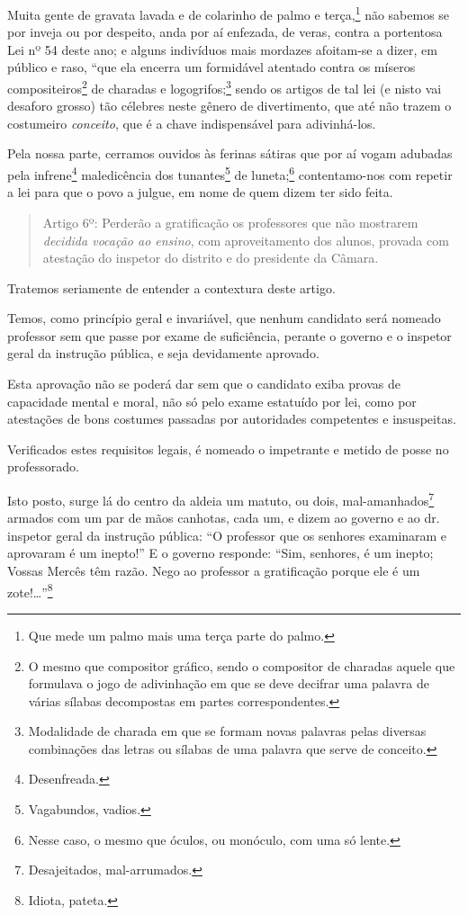 Muita gente de gravata lavada e de colarinho de palmo e
terça,\footnote{Que mede um palmo mais uma terça parte do palmo.} não
sabemos se por inveja ou por despeito, anda por aí enfezada, de veras,
contra a portentosa Lei nº 54 deste ano; e alguns indivíduos mais
mordazes afoitam-se a dizer, em público e raso, ``que ela encerra um
formidável atentado contra os míseros compositeiros\footnote{O mesmo
  que compositor gráfico, sendo o compositor de charadas aquele que
  formulava o jogo de adivinhação em que se deve decifrar uma palavra de
  várias sílabas decompostas em partes correspondentes.} de charadas e
logogrifos;\footnote{Modalidade de charada em que se formam novas palavras pelas diversas combinações das letras ou sílabas de uma palavra que serve de conceito.} sendo os artigos de tal
lei (e nisto vai desaforo grosso) tão célebres neste gênero de
divertimento, que até não trazem o costumeiro \emph{conceito}, que é a
chave indispensável para adivinhá-los.

Pela nossa parte, cerramos ouvidos às ferinas sátiras que por aí vogam
adubadas pela infrene\footnote{Desenfreada.} maledicência dos
tunantes\footnote{Vagabundos, vadios.} de luneta;\footnote{Nesse
  caso, o mesmo que óculos, ou monóculo, com uma só lente.}
contentamo-nos com repetir a lei para que o povo a julgue, em nome de
quem dizem ter sido feita.

\begin{quote}
Artigo 6º: Perderão a gratificação os professores que não mostrarem
\emph{decidida vocação ao ensino}, com aproveitamento dos alunos,
provada com atestação do inspetor do distrito e do presidente da
Câmara.
\end{quote}

Tratemos seriamente de entender a contextura deste artigo.

Temos, como princípio geral e invariável, que nenhum candidato será
nomeado professor sem que passe por exame de suficiência, perante o
governo e o inspetor geral da instrução pública, e seja devidamente
aprovado.

Esta aprovação não se poderá dar sem que o candidato exiba provas de
capacidade mental e moral, não só pelo exame estatuído por lei, como por
atestações de bons costumes passadas por autoridades competentes e
insuspeitas.

Verificados estes requisitos legais, é nomeado o impetrante e metido de
posse no professorado.

Isto posto, surge lá do centro da aldeia um matuto, ou dois,
mal-amanhados\footnote{Desajeitados, mal-arrumados.} armados com um
par de mãos canhotas, cada um, e dizem ao governo e ao dr.\,inspetor
geral da instrução pública: ``O professor que os senhores examinaram e
aprovaram é um inepto!'' E o governo responde: ``Sim, senhores, é um
inepto; Vossas Mercês têm razão. Nego ao professor a gratificação porque
ele é um zote!\ldots{}''\footnote{Idiota, pateta.}

